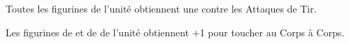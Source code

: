 \startpricelist

 Toutes les figurines de l'unité obtiennent une  contre les Attaques de Tir. 

 Les figurines de \barrowknights{} et de \barrowguards{} de l'unité obtiennent +1 pour toucher au Corps à Corps.

\endpricelist

\closearmymagicalitems








\quickrefsheettitle


\bigskip
\begin{center}\end{center}

\newcommand{\QRSinvoctable}[2]{%
\rowcolors{1}{white}{black!10}
\noindent\begin{tabular}{p{4cm}>{\centering\let\newline\\\arraybackslash\hspace{0pt}}p{1cm}@{}}%
\antiquefont\Large{\textbf{#1\spacebeforecolon{}:}}&\vspace*{-0.2cm}%
\DTLforeach*[#2]{profiles}{\rowname=name, \rowtrooptype=trooptype, \rowcategory=category, \rowinvocation=invocation}{%
\tabularnewline\rowname{} & \rowinvocation{}}%
\tabularnewline%
\end{tabular}
\medskip
}

